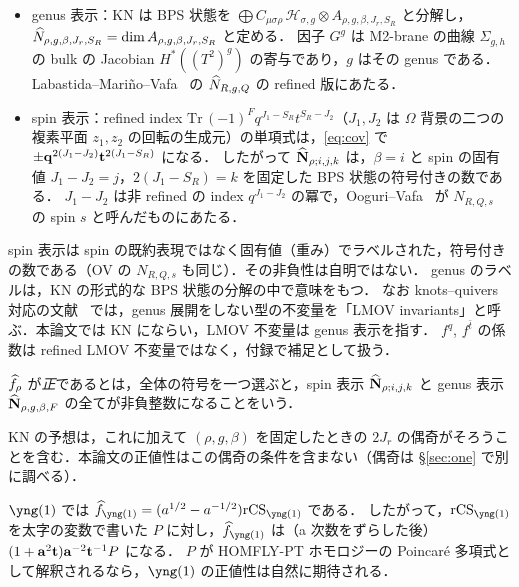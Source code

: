 \begin{itemize}
\item genus 表示：KN は BPS 状態を $\bigoplus C_{\mu\sigma\rho}\,\mathcal{H}_{\sigma,g}\otimes A_{\rho,g,\beta,J_r,S_R}$ と分解し，$\widehat N_{\rho,g,\beta,J_r,S_R}=\dim A_{\rho,g,\beta,J_r,S_R}$ と定める．
因子 $G^g$ は M2-brane の曲線 $\Sigma_{g,h}$ の bulk の Jacobian $H^*((T^2)^g)$ の寄与であり，$g$ はその genus である．
Labastida--Mariño--Vafa~\cite{Labastida01} の $\widehat N_{R,g,Q}$ の refined 版にあたる．
\item spin 表示：refined index $\mathrm{Tr}\,(-1)^Fq^{J_1-S_R}t^{S_R-J_2}$（$J_1,J_2$ は $\Omega$ 背景の二つの複素平面 $z_1,z_2$ の回転の生成元）の単項式は，\eqref{eq:cov} で $\pm\mathbf{q}^{2(J_1-J_2)}\mathbf{t}^{2(J_1-S_R)}$ になる．
したがって $\widehat{\mathbf N}_{\rho;i,j,k}$ は，$\beta=i$ と spin の固有値 $J_1-J_2=j$，$2(J_1-S_R)=k$ を固定した BPS 状態の符号付きの数である．
$J_1-J_2$ は非 refined の index $q^{J_1-J_2}$ の冪で，Ooguri--Vafa~\cite{Ooguri99} が $N_{R,Q,s}$ の spin $s$ と呼んだものにあたる．
\end{itemize}
spin 表示は spin の既約表現ではなく固有値（重み）でラベルされた，符号付きの数である（OV の $N_{R,Q,s}$ も同じ）．その非負性は自明ではない．
genus のラベルは，KN の形式的な BPS 状態の分解の中で意味をもつ．
なお knots--quivers 対応の文献~\cite{Ekholm18} では，genus 展開をしない型の不変量を「LMOV invariants」と呼ぶ．本論文では KN にならい，LMOV 不変量は genus 表示を指す．
$f^q$, $f^{\bar t}$ の係数は refined LMOV 不変量ではなく，付録で補足として扱う．

\begin{definition}[正値性]\label{def:positivity}
$\widehat f_\rho$ が\emph{正}であるとは，全体の符号を一つ選ぶと，spin 表示 $\widehat{\mathbf N}_{\rho;i,j,k}$ と genus 表示 $\widehat{\mathbf N}_{\rho,g,\beta,F}$ の全てが非負整数になることをいう．
\end{definition}
KN の予想は，これに加えて $(\rho,g,\beta)$ を固定したときの $2J_r$ の偶奇がそろうことを含む．本論文の正値性はこの偶奇の条件を含まない（偶奇は \S\ref{sec:one} で別に調べる）．

$\yng(1)$ では $\hf_{\yng(1)}=(a^{1/2}-a^{-1/2})\rCS_{\yng(1)}$ である．
したがって，$\rCS_{\yng(1)}$ を太字の変数で書いた $P$ に対し，$\hf_{\yng(1)}$ は（a 次数をずらした後）$(1+\mathbf{a}^2\mathbf{t})\mathbf{a}^{-2}\mathbf{t}^{-1}P$ になる．
$P$ が HOMFLY-PT ホモロジーの Poincaré 多項式として解釈されるなら，$\yng(1)$ の正値性は自然に期待される．
